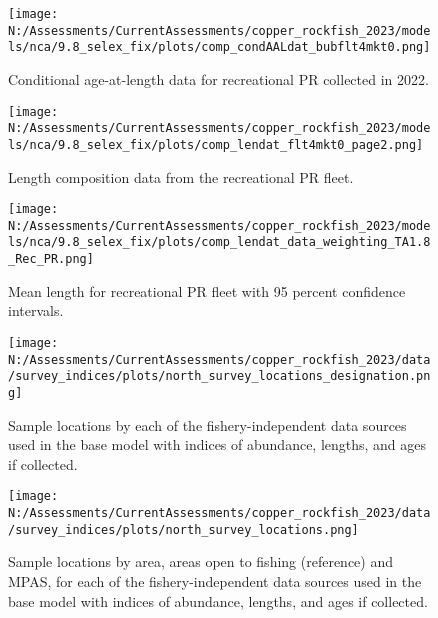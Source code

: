 \documentclass[11pt,
  english,
  letterpaper,
]{article}
\begin{document}
\pagebreak

\begin{figure}
\centering
\texttt{[image: N:/Assessments/CurrentAssessments/copper\_rockfish\_2023/models/nca/9.8\_selex\_fix/plots/comp\_condAALdat\_bubflt4mkt0.png]}
\caption{Conditional age-at-length data for recreational PR collected in 2022.\label{fig:rec-pr-caal-data}}
\end{figure}

\pagebreak

\begin{figure}
\centering
\texttt{[image: N:/Assessments/CurrentAssessments/copper\_rockfish\_2023/models/nca/9.8\_selex\_fix/plots/comp\_lendat\_flt4mkt0\_page2.png]}
\caption{Length composition data from the recreational PR fleet.\label{fig:rec-pr-len-data}}
\end{figure}

\pagebreak

\begin{figure}
\centering
\texttt{[image: N:/Assessments/CurrentAssessments/copper\_rockfish\_2023/models/nca/9.8\_selex\_fix/plots/comp\_lendat\_data\_weighting\_TA1.8\_Rec\_PR.png]}
\caption{Mean length for recreational PR fleet with 95 percent confidence intervals.\label{fig:mean-rec-pr-len-data}}
\end{figure}

\pagebreak

\begin{figure}
\centering
\texttt{[image: N:/Assessments/CurrentAssessments/copper\_rockfish\_2023/data/survey\_indices/plots/north\_survey\_locations\_designation.png]}
\caption{Sample locations by each of the fishery-independent data sources used in the base model with indices of abundance, lengths, and ages if collected.\label{fig:survey-locations}}
\end{figure}

\pagebreak

\begin{figure}
\centering
\texttt{[image: N:/Assessments/CurrentAssessments/copper\_rockfish\_2023/data/survey\_indices/plots/north\_survey\_locations.png]}
\caption{Sample locations by area, areas open to fishing (reference) and MPAS, for each of the fishery-independent data sources used in the base model with indices of abundance, lengths, and ages if collected.\label{fig:ref-mpa}}
\end{figure}
\end{document}

